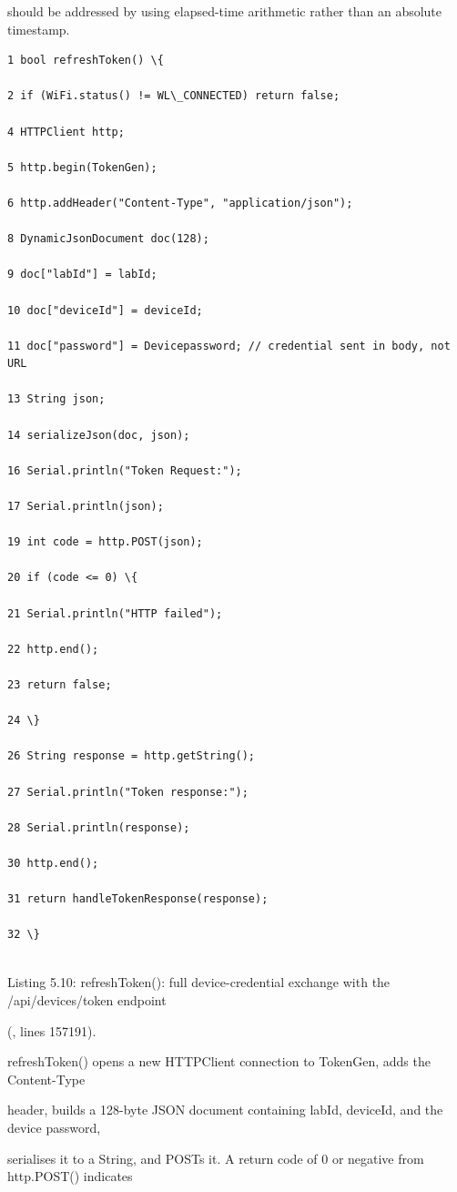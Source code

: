 should be addressed by using elapsed-time arithmetic rather than an absolute timestamp.

\begin{listingbox}
	\begin{verbatim}
1 bool refreshToken() \{

2 if (WiFi.status() != WL\_CONNECTED) return false;

4 HTTPClient http;

5 http.begin(TokenGen);

6 http.addHeader("Content-Type", "application/json");

8 DynamicJsonDocument doc(128);

9 doc["labId"] = labId;

10 doc["deviceId"] = deviceId;

11 doc["password"] = Devicepassword; // credential sent in body, not URL

13 String json;

14 serializeJson(doc, json);

16 Serial.println("Token Request:");

17 Serial.println(json);

19 int code = http.POST(json);

20 if (code <= 0) \{

21 Serial.println("HTTP failed");

22 http.end();

23 return false;

24 \}

26 String response = http.getString();

27 Serial.println("Token response:");

28 Serial.println(response);

30 http.end();

31 return handleTokenResponse(response);

32 \}


\end{verbatim}
\end{listingbox}
Listing 5.10: refreshToken(): full device-credential exchange with the /api/devices/token endpoint

(, lines 157191).

refreshToken() opens a new HTTPClient connection to TokenGen, adds the Content-Type

header, builds a 128-byte JSON document containing labId, deviceId, and the device password,

serialises it to a String, and POSTs it. A return code of 0 or negative from http.POST() indicates

